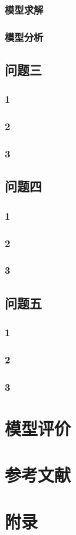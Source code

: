 \documentclass[UTF8]{ctexart}
\begin{document}
	\subsubsection{模型求解}
	\subsubsection{模型分析}
	
	\subsection{问题三}
	\subsubsection{1}
	\subsubsection{2}
	\subsubsection{3}
	
	\subsection{问题四}
	\subsubsection{1}
	\subsubsection{2}
	\subsubsection{3}
	
	\subsection{问题五}
	\subsubsection{1}
	\subsubsection{2}
	\subsubsection{3}
	
	\section{模型评价}
	
	
	\section{参考文献}
	
	\section{附录}
	\begin{appendices}
		
	\end{appendices}
	
\end{document}
